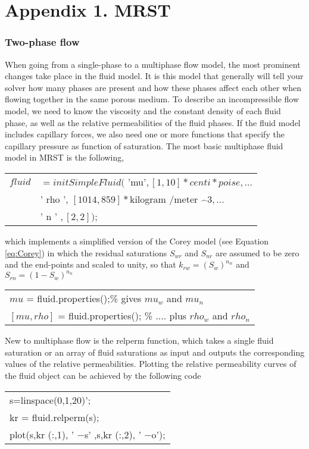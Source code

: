 \documentclass[a4paper,10pt]{report}
\begin{document}
\appendix
\section*{Appendix 1. MRST}\label{a1}
\subsubsection{Two-phase flow}
When going from a single-phase to a multiphase flow model, the most prominent changes take place in the fluid model. It is this model that generally will
tell your solver how many phases are present and how these phases affect each
other when flowing together in the same porous medium. 
To describe an incompressible flow model, we need to know the viscosity
and the constant density of each fluid phase, as well as the relative permeabilities of the fluid phases. If the fluid model includes capillary forces, we also need one or more functions that specify the capillary pressure as function of saturation. The most basic multiphase fluid model in MRST is the following,
\begin{table}[!ht]
\centering
\begin{tabular}{ |cl |} 
\hline
$fluid$ &$= initSimpleFluid($ 'mu'$ , [ 1, 10]*centi* poise, ...$\\
&' rho ',  $ [1014, 859 ] * $kilogram /meter $\hat{ \text{ }} 3, ...$\\
&' n ' $, [ 2,2]);$\\
 \hline
\end{tabular}
\label{table:fluid}
\end{table}  

which implements a simplified version of the Corey model (see Equation \ref{eq:Corey}) in which the residual saturations $S_{wr}$ and $S_{nr}$ are assumed to be zero and the end-points
and  scaled to unity, so that $k_{rw} = (S_w)^{n_w}$ and $S_{rn} = (1 − S_w)^{n_n}$

\begin{table}[!ht]
\centering
\begin{tabular}{ |l |} 
\hline
$mu$ = fluid.properties();\% gives $mu_w$ and $mu_n$ \\
$[mu,rho]$ = fluid.properties(); \% .... plus $rho_w$ and $rho_n$\\
 \hline
\end{tabular}
\label{table:fluidp}
\end{table}  
New to multiphase flow is the relperm function, which takes a single fluid saturation or an array of fluid saturations as input and outputs the corresponding
values of the relative permeabilities. Plotting the relative permeability curves
of the fluid object can be achieved by the following code
\begin{table}[!ht]
\centering
\begin{tabular}{ |l |} 
\hline
s=linspace(0,1,20)';\\
kr = fluid.relperm(s);\\
plot(s,kr (:,1), ' −s' ,s,kr (:,2), ' −o');\\
 \hline
\end{tabular}
\label{table:fluid}
\end{table} 
\end{document}
